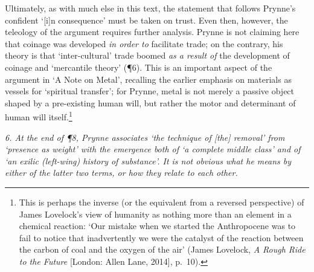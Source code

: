 \documentclass[]{article}
\begin{document}
Ultimately, as with much else in this text, the statement that follows
Prynne’s confident ‘{[}i{]}n consequence’ must be taken on trust. Even
then, however, the teleology of the argument requires further analysis.
Prynne is not claiming here that coinage was developed \emph{in order
to} facilitate trade; on the contrary, his theory is that
‘inter-cultural’ trade boomed \emph{as a result of} the development of
coinage and ‘mercantile theory’ (¶6). This is an important aspect of the
argument in ‘A Note on Metal’, recalling the earlier emphasis on
materials as vessels for ‘spiritual transfer’; for Prynne, metal is not
merely a passive object shaped by a pre-existing human will, but rather
the motor and determinant of human will itself.\footnote{This is perhaps
  the inverse (or the equivalent from a reversed perspective) of James
  Lovelock’s view of humanity as nothing more than an element in a
  chemical reaction: ‘Our mistake when we started the Anthropocene was
  to fail to notice that inadvertently we were the catalyst of the
  reaction between the carbon of coal and the oxygen of the air’ (James
  Lovelock, \emph{A Rough Ride to the Future} {[}London: Allen Lane,
  2014{]}, p.~10).}

\emph{6. At the end of ¶8, Prynne associates ‘the technique of {[}the{]}
removal’ from ‘presence as weight’ with the emergence both of ‘a
complete middle class’ and of ‘an exilic (left-wing) history of
substance’. It is not obvious what he means by either of the latter two
terms, or how they relate to each other.}
\end{document}
